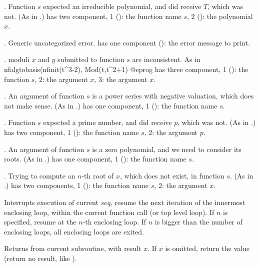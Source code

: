  \item {}. Function $s$ expected an irreducible polynomial,
 and did receive $T$, which was not. (As in .)
  has two component, 1 (): the function name $s$,
 2 (): the polynomial $x$.

 \item {}. Generic uncategorized error.
  has one component (): the error message to print.

 \item {}. moduli $x$ and $y$ submitted to function $s$ are
 inconsistent. As in
 \bprog
   nfalgtobasis(nfinit(t^3-2), Mod(t,t^2+1)
 @eprog\noindent
  has three component, 1 (): the function $s$,
 2: the argument $x$, 3: the argument $x$.

 \item {}. An argument of function $s$ is a power series with
 negative valuation, which does not make sense. (As in .)
  has one component, 1 (): the function name $s$.

 \item {}. Function $s$ expected a prime number,
 and did receive $p$, which was not. (As in .)
  has two component, 1 (): the function name $s$,
 2: the argument $p$.

 \item {}. An argument of function $s$ is a zero polynomial,
 and we need to consider its roots. (As in .)  has
 one component, 1 (): the function name $s$.

 \item {}. Trying to compute an $n$-th root of $x$, which does
 not exist, in function $s$. (As in .)
  has two components, 1 (): the function name $s$,
 2: the argument $x$.

\label{se:next}
Interrupts execution of current $seq$,
resume the next iteration of the innermost enclosing loop, within the
current function call (or top level loop). If $n$ is specified, resume at
the $n$-th enclosing loop. If $n$ is bigger than the number of enclosing
loops, all enclosing loops are exited.

\label{se:return}
Returns from current subroutine, with
result $x$. If $x$ is omitted, return the  value (return no
result, like ).

